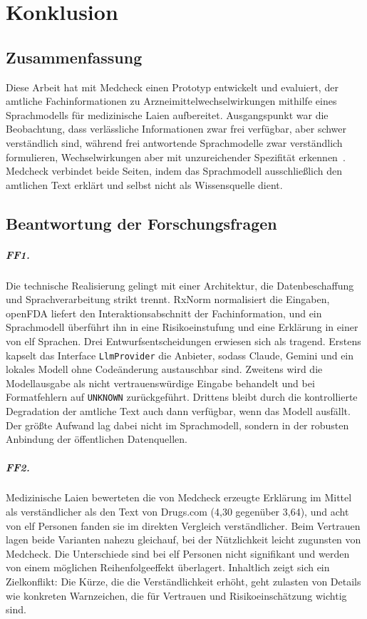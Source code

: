 \chapter{Konklusion}
\label{ch:konklusion}

\section{Zusammenfassung}

Diese Arbeit hat mit Medcheck einen Prototyp entwickelt und evaluiert, der amtliche Fachinformationen zu Arzneimittelwechselwirkungen mithilfe eines Sprachmodells für medizinische Laien aufbereitet. Ausgangspunkt war die Beobachtung, dass verlässliche Informationen zwar frei verfügbar, aber schwer verständlich sind, während frei antwortende Sprachmodelle zwar verständlich formulieren, Wechselwirkungen aber mit unzureichender Spezifität erkennen~\cite{MOHAMMED2026100733}. Medcheck verbindet beide Seiten, indem das Sprachmodell ausschließlich den amtlichen Text erklärt und selbst nicht als Wissensquelle dient.

\section{Beantwortung der Forschungsfragen}

\paragraph{FF1.} Die technische Realisierung gelingt mit einer Architektur, die Datenbeschaffung und Sprachverarbeitung strikt trennt. RxNorm normalisiert die Eingaben, openFDA liefert den Interaktionsabschnitt der Fachinformation, und ein Sprachmodell überführt ihn in eine Risikoeinstufung und eine Erklärung in einer von elf Sprachen. Drei Entwurfsentscheidungen erwiesen sich als tragend. Erstens kapselt das Interface \texttt{LlmProvider} die Anbieter, sodass Claude, Gemini und ein lokales Modell ohne Codeänderung austauschbar sind. Zweitens wird die Modellausgabe als nicht vertrauenswürdige Eingabe behandelt und bei Formatfehlern auf \texttt{UNKNOWN} zurückgeführt. Drittens bleibt durch die kontrollierte Degradation der amtliche Text auch dann verfügbar, wenn das Modell ausfällt. Der größte Aufwand lag dabei nicht im Sprachmodell, sondern in der robusten Anbindung der öffentlichen Datenquellen.

\paragraph{FF2.} Medizinische Laien bewerteten die von Medcheck erzeugte Erklärung im Mittel als verständlicher als den Text von Drugs.com (4{,}30 gegenüber 3{,}64), und acht von elf Personen fanden sie im direkten Vergleich verständlicher. Beim Vertrauen lagen beide Varianten nahezu gleichauf, bei der Nützlichkeit leicht zugunsten von Medcheck. Die Unterschiede sind bei elf Personen nicht signifikant und werden von einem möglichen Reihenfolgeeffekt überlagert. Inhaltlich zeigt sich ein Zielkonflikt: Die Kürze, die die Verständlichkeit erhöht, geht zulasten von Details wie konkreten Warnzeichen, die für Vertrauen und Risikoeinschätzung wichtig sind.

